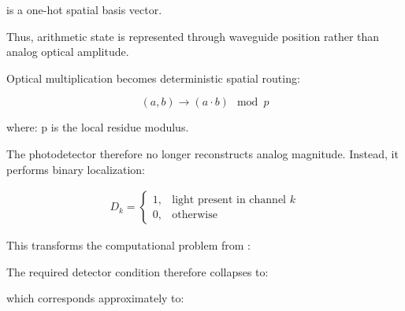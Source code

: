 \documentclass[journal]{IEEEtran}
\begin{document}
is a one-hot spatial basis vector.

Thus, arithmetic state is represented through waveguide position rather than analog optical amplitude.

Optical multiplication becomes deterministic spatial routing:

\begin{equation}
(a, b) \rightarrow (a \cdot b) \mod p
\label{eq:rns_multiplication}
\end{equation}

where: p is the local residue modulus.

The photodetector therefore no longer reconstructs analog magnitude. Instead, it performs binary localization:

\begin{align}
D_k
=
\begin{cases}
1,
&
\text{light present in channel } k
\\
0,
&
\text{otherwise}
\end{cases}
\label{eq:binary_detection}
\end{align}

This transforms the computational problem from :

\begin{center}
\end{center}

The required detector condition therefore collapses to:

\begin{center}
\label{eq:binary_condition}
\end{center}

which corresponds approximately to:

\begin{center}
\end{center}
\end{document}
